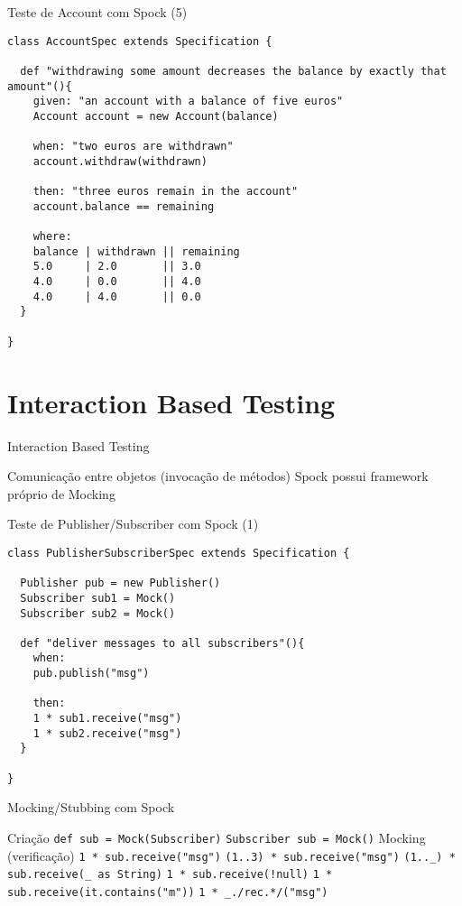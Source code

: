 \documentclass{beamer}
\begin{document}
\begin{frame}[fragile]{Teste de Account com Spock (5)}
 \begin{verbatim}
class AccountSpec extends Specification {
  
  def "withdrawing some amount decreases the balance by exactly that amount"(){
    given: "an account with a balance of five euros"
    Account account = new Account(balance)
    
    when: "two euros are withdrawn"
    account.withdraw(withdrawn)
    
    then: "three euros remain in the account"
    account.balance == remaining
    
    where:
    balance | withdrawn || remaining
    5.0     | 2.0       || 3.0
    4.0     | 0.0       || 4.0
    4.0     | 4.0       || 0.0
  }
  
}
  \end{verbatim}
\end{frame}

\section{Interaction Based Testing}

\begin{frame}{Interaction Based Testing}
 \begin{outline}
    Comunicação entre objetos (invocação de métodos)
    Spock possui framework próprio de Mocking
 \end{outline}
\end{frame}

\begin{frame}[fragile]{Teste de Publisher/Subscriber com Spock (1)}
 \begin{verbatim}
class PublisherSubscriberSpec extends Specification {

  Publisher pub = new Publisher()
  Subscriber sub1 = Mock()
  Subscriber sub2 = Mock()
  
  def "deliver messages to all subscribers"(){
    when:
    pub.publish("msg")
    
    then:
    1 * sub1.receive("msg")
    1 * sub2.receive("msg")
  }
  
}
  \end{verbatim}
\end{frame}

\begin{frame}{Mocking/Stubbing com Spock}
 \begin{outline}
    Criação
    \2 \texttt{def sub = Mock(Subscriber)}
    \2 \texttt{Subscriber sub = Mock()}
    Mocking (verificação)
     \texttt{1 * sub.receive("msg")}
     \texttt{(1..3) * sub.receive("msg")}
     \texttt{(1.._) * sub.receive(_ as String)}
     \texttt{1 * sub.receive(!null)}
     \texttt{1 * sub.receive({it.contains("m")})}
     \texttt{1 * _./rec.*/("msg")}
 \end{outline}
\end{frame}
\end{document}
